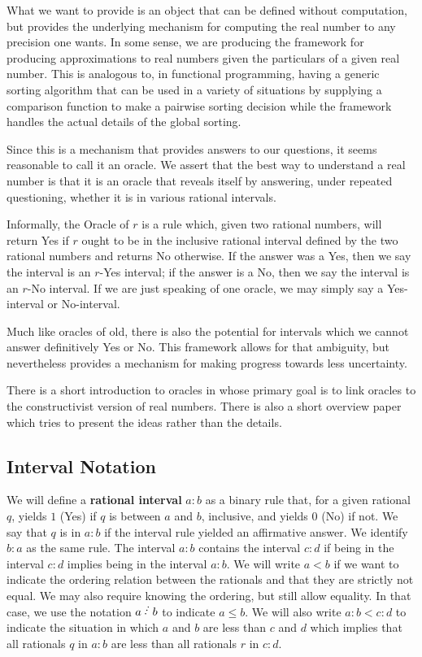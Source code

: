 \documentclass[12pt]{article}
\begin{document}
What we want to provide is an object that can be defined without computation, but provides the underlying mechanism for computing the real number to any precision one wants. In some sense, we are producing the framework for producing approximations to real numbers given the particulars of a given real number.  This is analogous to, in functional programming,  having a generic sorting algorithm that can be used in a variety of situations by supplying a comparison function to make a pairwise sorting decision while the framework handles the actual details of the global sorting.

Since this is a mechanism that provides answers to our questions, it seems reasonable to call it an oracle. We assert that the best way to understand a real number is that it is an oracle that reveals itself by answering, under repeated questioning, whether it is in various rational intervals. 

Informally, the Oracle of $r$ is a rule which, given two rational numbers, will return Yes if $r$ ought to be in the inclusive rational interval defined by the two rational numbers and returns No otherwise. If the answer was a Yes, then we say the interval is an $r$-Yes interval; if the answer is a No, then we say the interval is an $r$-No interval.  If we are just speaking of one oracle, we may simply say a Yes-interval or No-interval. 

Much like oracles of old, there is also the potential for intervals which we cannot answer definitively Yes or No. This framework allows for that ambiguity, but nevertheless provides a mechanism for making progress towards less uncertainty. 

There is a short introduction to oracles in \cite{taylor23teaser} whose primary goal is to link oracles to the constructivist version of real numbers. There is also a short overview paper \cite{taylor23over} which tries to present the ideas rather than the details. 

\subsection{Interval Notation}

We will define a \textbf{rational interval} $a:b$ as a binary rule that, for a given rational $q$, yields $1$ (Yes) if $q$ is between $a$ and $b$, inclusive, and yields $0$ (No) if not. We say that $q$ is in $a:b$ if the interval rule yielded an affirmative answer.  We identify $b:a$ as the same rule. The interval $a:b$ contains the interval $c:d$ if being in the interval $c:d$ implies being in the interval $a:b$. We will write $a\lt b$ if we want to indicate the ordering relation between the rationals and that they are strictly not equal. We may also require knowing the ordering, but still allow equality. In that case, we use the notation $a \lte b$ to indicate $a \leq b$.  We will also write $a:b < c:d$ to indicate the situation in which $a$ and $b$ are less than $c$ and $d$ which implies that all rationals $q$ in $a:b$ are less than all rationals $r$ in $c:d$. 
\end{document}
